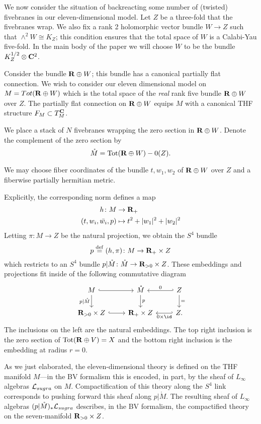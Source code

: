 \parsec[s:brfive]

We now consider the situation of backreacting some number of (twisted) fivebranes in our eleven-dimensional model.
Let $Z$ be a three-fold that the fivebranes wrap.
We also fix a rank 2 holomorphic vector bundle $W\to Z$ such that $\wedge^{2} W \cong K_{Z}$;
this condition ensures that the total space of $W$ is a Calabi-Yau five-fold. In the main body of the paper we will choose $W$ to be the bundle $K_{Z}^{1/2}\otimes \mathbf{C}^{2}$.

Consider the bundle $\mathbf{R}\oplus W$; this bundle has a canonical partially flat connection. We wish to consider our eleven dimensional model on $M = Tot (\mathbf{R}\oplus W)$ which is the total space of the \textit{real} rank five bundle $\mathbf{R}\oplus W$ over $Z$. The partially flat connection on $\mathbf{R}\oplus W$ equips $M$ with a canonical THF structure $F_{M}\subset T_{M}^{\mathbf{C}}$.

We place a stack of $N$ fivebranes wrapping the zero section in $\mathbf{R}\oplus W$.
Denote the complement of the zero section by
\[
\mathring{M} = \text{Tot}(\mathbf{R}\oplus W) - 0(Z).
\]

We may choose fiber coordinates of the bundle $t, w_{1}, w_{2}$ of $\mathbf{R} \oplus W$ over $Z$ and a fiberwise partially hermitian metric.

Explicitly, the corresponding norm defines a map
\begin{align*}
 h \colon  M & \to \mathbf{R}_{+} \\
  (t, w_{i}, \bar{w_{i}}, p)& \mapsto t^{2} + |w_{1}|^{2}+|w_{2}|^{2}
\end{align*}
Letting $\pi \colon M \to Z$ be the natural projection, we obtain the $S^{4}$ bundle
\[
p \overset{\rm def}{=} (h,\pi) \colon M \to \mathbf{R}_{+}\times Z
\]
which restricts to an $S^4$ bundle $p|\mathring {M} \colon \mathring{M} \to \mathbf{R}_{>0} \times Z$.
These embeddings and projections fit inside of the following commutative diagram
\[
\begin{tikzcd}
M \ar[d,"p|\mathring M"'] \ar[r,hook] & \mathring{M} \ar[d,"p"] & \ar[l,hook',"0"'] Z \ar[d,"="] \\
\R_{>0} \times Z \ar[r,hook] & \R_{+} \times Z & \ar[l,hook',"0 \times \id"] Z.
\end{tikzcd}
\]
The inclusions on the left are the natural embeddings.
The top right inclusion is the zero section of ${\rm Tot}(\mathbf{R} \oplus V) = X$ and the bottom right inclusion is the embedding at radius $r = 0$.

As we just elaborated, the eleven-dimensional theory is defined on the THF manifold $M$---in the BV formalism this is encoded, in part, by the sheaf of $L_\infty$ algebras $\mathcal L_{sugra}$ on $M$.
Compactification of this theory along the $S^4$ link corresponds to pushing forward this sheaf along $p|\mathring M$.
The resulting sheaf of $L_\infty$ algebras $(p|\mathring M)_*\mathcal L_{sugra}$ describes, in the BV formalism, the compactified theory on the seven-manifold $\mathbf{R}_{>0} \times Z$.

